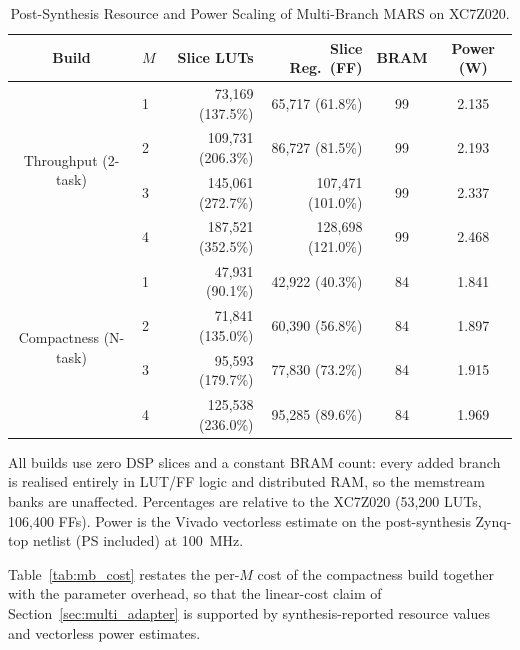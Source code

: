 \documentclass[12pt, a4paper]{report}
\numberwithin{equation}{chapter}
\numberwithin{figure}{chapter}
\numberwithin{table}{chapter}
\numberwithin{algorithm}{chapter}
\begin{document}
\begin{table}[H]
\centering
\caption{Post-Synthesis Resource and Power Scaling of Multi-Branch MARS on XC7Z020.}
\label{tab:multibranch_scaling}
\small
\renewcommand{\arraystretch}{1.2}%
\setlength{\tabcolsep}{4.5pt}%
\begin{tabular}{clrrcc}
\toprule
\textbf{Build} & \textbf{$M$} & \textbf{Slice LUTs} & \textbf{Slice Reg.\ (FF)} & \textbf{BRAM} & \textbf{Power (W)} \\
\midrule
\multirow{4}{*}{Throughput (2-task)}
 & 1 & 73{,}169 (137.5\%)  & 65{,}717 (61.8\%)   & 99 & 2.135 \\
 & 2 & 109{,}731 (206.3\%) & 86{,}727 (81.5\%)   & 99 & 2.193 \\
 & 3 & 145{,}061 (272.7\%) & 107{,}471 (101.0\%) & 99 & 2.337 \\
 & 4 & 187{,}521 (352.5\%) & 128{,}698 (121.0\%) & 99 & 2.468 \\
\midrule
\multirow{4}{*}{Compactness (N-task)}
 & 1 & 47{,}931 (90.1\%)   & 42{,}922 (40.3\%)   & 84 & 1.841 \\
 & 2 & 71{,}841 (135.0\%)  & 60{,}390 (56.8\%)   & 84 & 1.897 \\
 & 3 & 95{,}593 (179.7\%)  & 77{,}830 (73.2\%)   & 84 & 1.915 \\
 & 4 & 125{,}538 (236.0\%) & 95{,}285 (89.6\%)   & 84 & 1.969 \\
\bottomrule
\end{tabular}
\begin{flushleft}
\footnotesize All builds use zero DSP slices and a constant BRAM count: every added branch is realised entirely in LUT/FF logic and distributed RAM, so the memstream banks are unaffected. Percentages are relative to the XC7Z020 (53{,}200 LUTs, 106{,}400 FFs). Power is the Vivado vectorless estimate on the post-synthesis Zynq-top netlist (PS included) at 100~MHz.
\end{flushleft}
\end{table}

Table~\ref{tab:mb_cost} restates the per-$M$ cost of the compactness build together with the parameter overhead, so that the linear-cost claim of Section~\ref{sec:multi_adapter} is supported by synthesis-reported resource values and vectorless power estimates.

\begin{table}[H]
\centering
\caption{Per-Branch Parameter and Post-Synthesis Cost of the Compactness Build.}
\label{tab:mb_cost}
\end{table}
\end{document}
